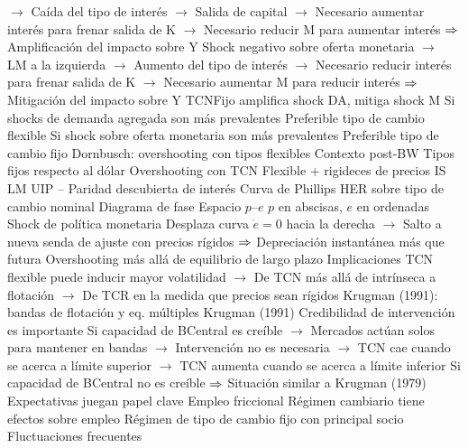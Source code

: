 \documentclass{nuevotema}
\begin{document}
\begin{esquemal}
				\4[] $\to$ Caída del tipo de interés
				\4[] $\to$ Salida de capital
				\4[] $\to$ Necesario aumentar interés para frenar salida de K
				\4[] $\to$ Necesario reducir M para aumentar interés
				\4[] $\then$ Amplificación del impacto sobre Y
				\4[] Shock negativo sobre oferta monetaria
				\4[] $\to$ LM a la izquierda
				\4[] $\to$ Aumento del tipo de interés
				\4[] $\to$ Necesario reducir interés para frenar salida de K
				\4[] $\to$ Necesario aumentar M para reducir interés
				\4[] $\then$ Mitigación del impacto sobre Y
				\4[$\then$] TCNFijo amplifica shock DA, mitiga shock M
				\4 Si shocks de demanda agregada son más prevalentes
				\4[] Preferible tipo de cambio flexible
				\4 Si shock sobre oferta monetaria son más prevalentes
				\4[] Preferible tipo de cambio fijo
			\3 Dornbusch: overshooting con tipos flexibles
				\4 Contexto post-BW
				\4[] Tipos fijos respecto al dólar
				\4 Overshooting con TCN Flexible + rigideces de precios
				\4[] 
				\4 IS
				\4[] 
				\4 LM
				\4[] 
				\4 UIP -- Paridad descubierta de interés
				\4[] 
				\4 Curva de Phillips
				\4[] 
				\4 HER sobre tipo de cambio nominal
				\4[] 
				\4 Diagrama de fase
				\4[] Espacio $p$--$e$
				\4[] $p$ en abscisas, $e$ en ordenadas
				\4 Shock de política monetaria
				\4[] Desplaza curva $\dot{e} = 0$ hacia la derecha
				\4[] $\to$ Salto a nueva senda de ajuste con precios rígidos
				\4[] $\then$ Depreciación instantánea más que futura
				\4[$\then$] Overshooting más allá de equilibrio de largo plazo
				\4 Implicaciones
				\4[] TCN flexible puede inducir mayor volatilidad
				\4[] $\to$ De TCN más allá de intrínseca a flotación
				\4[] $\to$ De TCR en la medida que precios sean rígidos
			\3 Krugman (1991): bandas de flotación y eq. múltiples
				\4 Krugman (1991)
				\4 Credibilidad de intervención es importante
				\4[] Si capacidad de BCentral es creíble
				\4[] $\to$ Mercados actúan solos para mantener en bandas
				\4[] $\to$ Intervención no es necesaria
				\4[] $\to$ TCN cae cuando se acerca a límite superior
				\4[] $\to$ TCN aumenta cuando se acerca a límite inferior
				\4 Si capacidad de BCentral no es creíble
				\4[] $\then$ Situación similar a Krugman (1979)
				\4[$\then$] Expectativas juegan papel clave
			\3 Empleo friccional
				\4 Régimen cambiario tiene efectos sobre empleo
				\4 Régimen de tipo de cambio fijo con principal socio
				\4 Fluctuaciones frecuentes

\end{esquemal}
\end{document}
